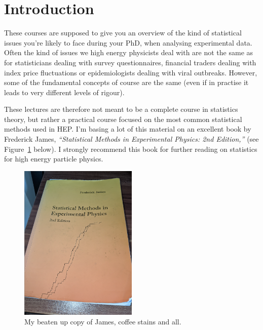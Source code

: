 \section{Introduction}

These courses are supposed to give you an overview of the kind of statistical issues you're likely to face during your PhD, when analysing experimental data. Often the kind of issues we high energy physicists deal with are not the same as for statisticians dealing with survey questionnaires, financial traders dealing with index price fluctuations or epidemiologists dealing with viral outbreaks. However, some of the fundamental concepts of course are the same (even if in practise it leads to very different levels of rigour). 

These lectures are therefore not meant to be a complete course in statistics theory, but rather a practical course focused on the most common statistical methods used in HEP. I'm basing a lot of this material on an excellent book by Frederick James, \emph{``Statistical Methods in Experimental Physics: 2nd Edition,''} (see Figure~\ref{fig:james} below). I strongly recommend this book for further reading on statistics for high energy particle physics. 

\begin{figure}[hbt!]
    \centering
    \includegraphics[width=0.5\textwidth]{figures/intro/james.png}
    \caption{My beaten up copy of James, coffee stains and all.}
    \label{fig:james}
\end{figure}

